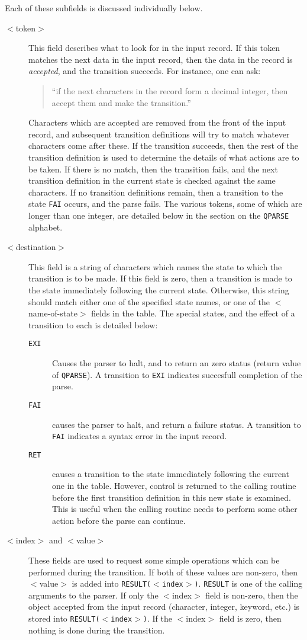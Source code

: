 Each of these subfields is discussed individually below.
\begin{description}
\item[$<$token$>$] This  field describes what to look for in the input record. 
If
this token matches the next data in the input record, then the data in
the record is {\em accepted}, and the transition succeeds. 
For instance, one 
can ask:
\begin{quote}
``if the next characters in the record form a decimal integer,
then accept them and make the transition.'' 
\end{quote}
Characters which are
accepted are removed from the front of the input record, and subsequent
transition definitions will try to match whatever characters come after
these. If the transition succeeds, then the rest of the transition
definition is used to determine the details of what actions are to be
taken. If there is no match, then the transition fails, and the next
transition definition in the current state is checked against the same
characters. If no transition definitions remain, then a transition to
the state {\tt FAI} occurs, and the parse fails. The various tokens, some
of which are longer than one integer, are detailed below in the
section on the {\tt QPARSE} alphabet.
\item[$<$destination$>$] This field is a string of characters which names the
state to which the transition is to be made. If this field is zero,
then a transition is made to the state immediately following the
current state. Otherwise, this string should match either one of the
specified state names, or one of the $<$name-of-state$>$ fields in the
table. The special states, and the effect of a transition to each is
detailed below:
\begin{description}
\item[{\tt EXI}]        Causes the parser to halt, and to return an 
zero
status (return value of {\tt QPARSE}). 
A transition to {\tt EXI} indicates succesfull
completion of the parse.
\item[{\tt FAI}]        causes the parser to halt, and return a failure
status. A transition to {\tt FAI} indicates a syntax
error in the input record.
\item[{\tt RET}]        causes a transition to the state immediately
following the current one in the table.
However, control is returned to the calling routine
before the first transition definition in this new
state is examined. This is useful when the calling
routine needs to perform some other action before
the parse can continue.
\end{description}
\item[ $<$index$>$ and $<$value$>$] These fields are used to request some simple
operations which can be performed during the transition. 
If both of
these values are non-zero, then  $<$value$>$  is added into
{\tt RESULT($<$index$>$)}. 
{\tt RESULT} is one of the calling arguments to the parser.
If only the $<$index$>$ field is non-zero, then the object accepted from
the input record (character, integer, keyword, etc.) is stored into
{\tt RESULT($<$index$>$)}. If the $<$index$>$ field is zero, then nothing is done
during the transition.
\end{description}
